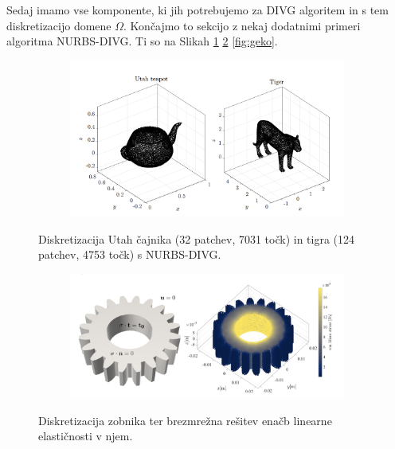 \documentclass{article}
\begin{document}
Sedaj imamo vse komponente, ki jih potrebujemo za DIVG algoritem in s tem diskretizacijo domene $\Omega$. 
Končajmo to sekcijo z nekaj dodatnimi primeri algoritma NURBS-DIVG. Ti so na Slikah \ref{fig:primeri} \ref{fig:cog} \ref{fig:geko}.
\begin{figure}[H]
\centering
\begin{subfigure}{.8\textwidth}
\includegraphics[width=\linewidth]{Slike/primeri.png}
\end{subfigure}
\caption{Diskretizacija Utah čajnika (32 patchev, 7031 točk) in tigra (124 patchev, 4753 točk) s NURBS-DIVG.}
\label{fig:primeri}
\end{figure}

\begin{figure}[H]
\centering
\begin{subfigure}{.6\textwidth}
\includegraphics[width=\linewidth]{Slike/cog.png}
\end{subfigure}
\caption{Diskretizacija zobnika ter brezmrežna rešitev enačb linearne elastičnosti v njem.}
\label{fig:cog}
\end{figure}
\end{document}

